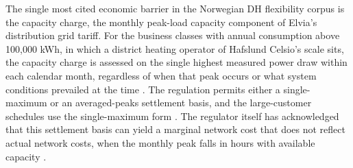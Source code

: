 The single most cited economic barrier in the Norwegian DH flexibility corpus is the capacity charge, the monthly peak-load capacity component of Elvia's distribution grid tariff. For the business classes with annual consumption above 100{,}000 kWh, in which a district heating operator of Hafslund Celsio's scale sits, the capacity charge is assessed on the single highest measured power draw within each calendar month, regardless of when that peak occurs or what system conditions prevailed at the time \cite{elvia_dagens_2022}. The regulation permits either a single-maximum or an averaged-peaks settlement basis, and the large-customer schedules use the single-maximum form \cite{rme_nettleie_2025}. The regulator itself has acknowledged that this settlement basis can yield a marginal network cost that does not reflect actual network costs, when the monthly peak falls in hours with available capacity \cite{Thema_fjernvarme_2024, eriksen_proposed_2022}.

